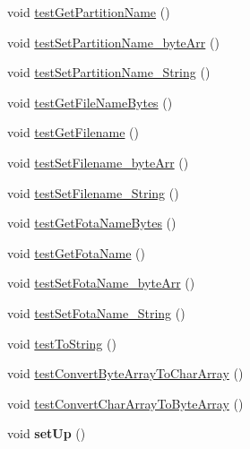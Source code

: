 \begin{DoxyCompactItemize}
\item 
void \hyperlink{class_c_a_s_u_a_l_1_1archiving_1_1libpit_1_1_pit_entry_test_a41a892fac2e3830201c8ee8742328dd6}{test\-Get\-Partition\-Name} ()
\item 
void \hyperlink{class_c_a_s_u_a_l_1_1archiving_1_1libpit_1_1_pit_entry_test_a1a157659b5634814096c2c5ffdd43ded}{test\-Set\-Partition\-Name\-\_\-byte\-Arr} ()
\item 
void \hyperlink{class_c_a_s_u_a_l_1_1archiving_1_1libpit_1_1_pit_entry_test_af7c9086de89f4a3b42075a7883229edf}{test\-Set\-Partition\-Name\-\_\-\-String} ()
\item 
void \hyperlink{class_c_a_s_u_a_l_1_1archiving_1_1libpit_1_1_pit_entry_test_aa7160a596712ac7970e099fb7f412467}{test\-Get\-File\-Name\-Bytes} ()
\item 
void \hyperlink{class_c_a_s_u_a_l_1_1archiving_1_1libpit_1_1_pit_entry_test_a969d85946542c81609b263b22605dc80}{test\-Get\-Filename} ()
\item 
void \hyperlink{class_c_a_s_u_a_l_1_1archiving_1_1libpit_1_1_pit_entry_test_a51ed5c9497a20dbc7919c485754192cc}{test\-Set\-Filename\-\_\-byte\-Arr} ()
\item 
void \hyperlink{class_c_a_s_u_a_l_1_1archiving_1_1libpit_1_1_pit_entry_test_ae5ef720f553c58f06e218101fc1b90d7}{test\-Set\-Filename\-\_\-\-String} ()
\item 
void \hyperlink{class_c_a_s_u_a_l_1_1archiving_1_1libpit_1_1_pit_entry_test_ac5b132b75d7a9ca6ca4ea0636cc86b57}{test\-Get\-Fota\-Name\-Bytes} ()
\item 
void \hyperlink{class_c_a_s_u_a_l_1_1archiving_1_1libpit_1_1_pit_entry_test_afb2bfcf15987c221f3cb0c33bb48eba3}{test\-Get\-Fota\-Name} ()
\item 
void \hyperlink{class_c_a_s_u_a_l_1_1archiving_1_1libpit_1_1_pit_entry_test_a952d90ef3b2afa8976c3c2e70be7a2fe}{test\-Set\-Fota\-Name\-\_\-byte\-Arr} ()
\item 
void \hyperlink{class_c_a_s_u_a_l_1_1archiving_1_1libpit_1_1_pit_entry_test_ae03349cb60c30d2a7ccd06f4f3a16771}{test\-Set\-Fota\-Name\-\_\-\-String} ()
\item 
void \hyperlink{class_c_a_s_u_a_l_1_1archiving_1_1libpit_1_1_pit_entry_test_ae90fd0a8ad37b95eac06c93804c6ce29}{test\-To\-String} ()
\item 
void \hyperlink{class_c_a_s_u_a_l_1_1archiving_1_1libpit_1_1_pit_entry_test_a4067db1e45c315476970e0d9c0ea0477}{test\-Convert\-Byte\-Array\-To\-Char\-Array} ()
\item 
void \hyperlink{class_c_a_s_u_a_l_1_1archiving_1_1libpit_1_1_pit_entry_test_aed669209ec4c036e23c4afa978074b72}{test\-Convert\-Char\-Array\-To\-Byte\-Array} ()
\item 
\hypertarget{class_c_a_s_u_a_l_1_1archiving_1_1libpit_1_1_pit_entry_test_ac3552eee5a02ebb59a6fd296288c3075}{void {\bfseries set\-Up} ()}\label{class_c_a_s_u_a_l_1_1archiving_1_1libpit_1_1_pit_entry_test_ac3552eee5a02ebb59a6fd296288c3075}


\end{DoxyCompactItemize}
